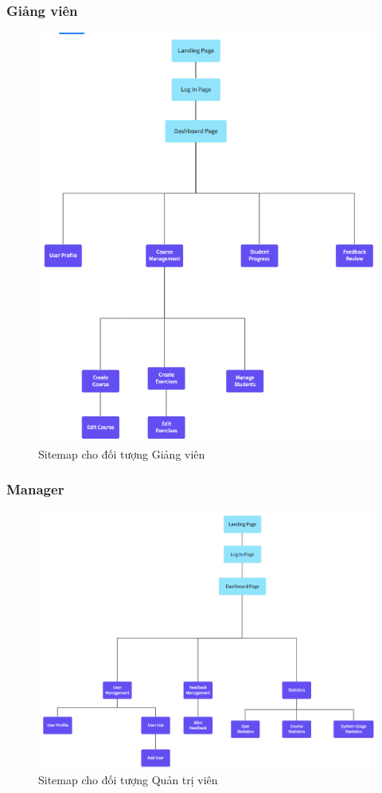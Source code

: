 \subsubsection{Giảng viên}
\begin{figure}[H]
    \centering
    \includegraphics[scale=0.7]{Images/sitemap/Instructor.png}
    \caption{Sitemap cho đối tượng Giảng viên}
    \label{fig:enter-label}
\end{figure}
\subsubsection{Manager}
\begin{figure}[H]
    \centering
    \includegraphics[scale=0.55]{Images/sitemap/Manager.png}
    \caption{Sitemap cho đối tượng Quản trị viên}
    \label{fig:enter-label}
\end{figure}
